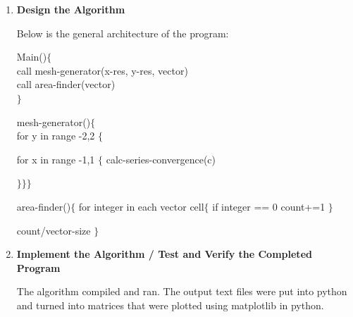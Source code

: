 \documentclass[12pt]{exam}
\begin{document}
\begin{enumerate}
            \item \textbf{Design the Algorithm}
            
                Below is the general architecture of the program:

                Main()$\lbrace$ \\
                    call mesh-generator(x-res, y-res, vector) \\
                    call area-finder(vector) \\
                $\rbrace$
                
                mesh-generator()$\lbrace$ \\
                    for y in range -2,2 $\lbrace$

                    for x in range -1,1 $\lbrace$
                        calc-series-convergence(c)

                $\rbrace \rbrace \rbrace$

                area-finder()$\lbrace$
                for integer in each vector cell$\lbrace$
                    if integer == 0 count+=1 $\rbrace$ 

                count/vector-size
                $\rbrace$


            \item \textbf{Implement the Algorithm / Test and Verify the Completed Program}
            
                The algorithm compiled and ran. The output text files were put into python and turned into matrices that were plotted using matplotlib in python. 

                \begin{center}
                \end{center}
            

        \end{enumerate}
\end{document}
